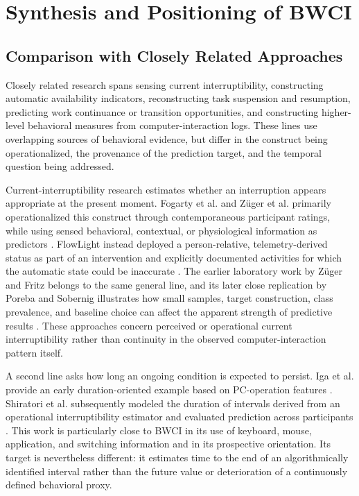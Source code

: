 \section{Synthesis and Positioning of BWCI}

\subsection{Comparison with Closely Related Approaches}

Closely related research spans sensing current interruptibility, constructing automatic availability indicators, reconstructing task suspension and resumption, predicting work continuance or transition opportunities, and constructing higher-level behavioral measures from computer-interaction logs. These lines use overlapping sources of behavioral evidence, but differ in the construct being operationalized, the provenance of the prediction target, and the temporal question being addressed.

Current-interruptibility research estimates whether an interruption appears appropriate at the present moment. Fogarty et al. and Züger et al. primarily operationalized this construct through contemporaneous participant ratings, while using sensed behavioral, contextual, or physiological information as predictors \parencite{fogarty2005interruptibility,zueger2018sensing}. FlowLight instead deployed a person-relative, telemetry-derived status as part of an intervention and explicitly documented activities for which the automatic state could be inaccurate \parencite{zueger2017flowlight}. The earlier laboratory work by Züger and Fritz belongs to the same general line, and its later close replication by Poreba and Sobernig illustrates how small samples, target construction, class prevalence, and baseline choice can affect the apparent strength of predictive results \parencite{zueger2015interruptibility,poreba2026replication}. These approaches concern perceived or operational current interruptibility rather than continuity in the observed computer-interaction pattern itself.

A second line asks how long an ongoing condition is expected to persist. Iga et al. provide an early duration-oriented example based on PC-operation features \parencite{iga2015uninterruptibleDuration}. Shiratori et al. subsequently modeled the duration of intervals derived from an operational interruptibility estimator and evaluated prediction across participants \parencite{shiratori2020workContinuance}. This work is particularly close to BWCI in its use of keyboard, mouse, application, and switching information and in its prospective orientation. Its target is nevertheless different: it estimates time to the end of an algorithmically identified interval rather than the future value or deterioration of a continuously defined behavioral proxy.

